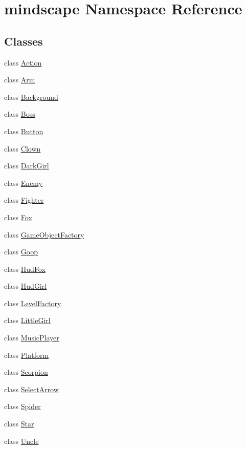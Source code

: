 \hypertarget{namespacemindscape}{}\section{mindscape Namespace Reference}
\label{namespacemindscape}
\subsection*{Classes}
\begin{DoxyCompactItemize}
\item 
class \hyperlink{classmindscape_1_1_action}{Action}
\item 
class \hyperlink{classmindscape_1_1_arm}{Arm}
\item 
class \hyperlink{classmindscape_1_1_background}{Background}
\item 
class \hyperlink{classmindscape_1_1_boss}{Boss}
\item 
class \hyperlink{classmindscape_1_1_button}{Button}
\item 
class \hyperlink{classmindscape_1_1_clown}{Clown}
\item 
class \hyperlink{classmindscape_1_1_dark_girl}{Dark\+Girl}
\item 
class \hyperlink{classmindscape_1_1_enemy}{Enemy}
\item 
class \hyperlink{classmindscape_1_1_fighter}{Fighter}
\item 
class \hyperlink{classmindscape_1_1_fox}{Fox}
\item 
class \hyperlink{classmindscape_1_1_game_object_factory}{Game\+Object\+Factory}
\item 
class \hyperlink{classmindscape_1_1_goop}{Goop}
\item 
class \hyperlink{classmindscape_1_1_hud_fox}{Hud\+Fox}
\item 
class \hyperlink{classmindscape_1_1_hud_girl}{Hud\+Girl}
\item 
class \hyperlink{classmindscape_1_1_level_factory}{Level\+Factory}
\item 
class \hyperlink{classmindscape_1_1_little_girl}{Little\+Girl}
\item 
class \hyperlink{classmindscape_1_1_music_player}{Music\+Player}
\item 
class \hyperlink{classmindscape_1_1_platform}{Platform}
\item 
class \hyperlink{classmindscape_1_1_scorpion}{Scorpion}
\item 
class \hyperlink{classmindscape_1_1_select_arrow}{Select\+Arrow}
\item 
class \hyperlink{classmindscape_1_1_spider}{Spider}
\item 
class \hyperlink{classmindscape_1_1_star}{Star}
\item 
class \hyperlink{classmindscape_1_1_uncle}{Uncle}
\end{DoxyCompactItemize}
